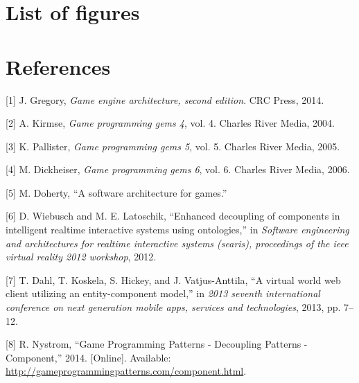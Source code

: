\documentclass[twoside, 12pt, a4paper, openany]{book}
\begin{document}
\chapter*{List of figures}\label{list-of-figures}

\makeatletter
\renewcommand\listoffigures{%
} \makeatother

\listoffigures

\footnotesize
\clearpage
\pagestyle{plain} \fancyhf{} \lhead{} \chead{} \rhead{} \lfoot{}
\cfoot{} \rfoot{}

\chapter*{References}\label{references}

\hypertarget{refs}{}
\hypertarget{ref-gregory2014game}{}
{[}1{]} J. Gregory, \emph{Game engine architecture, second edition}. CRC
Press, 2014.

\hypertarget{ref-game_programming_gems_4}{}
{[}2{]} A. Kirmse, \emph{Game programming gems 4}, vol. 4. Charles River
Media, 2004.

\hypertarget{ref-game_programming_gems_5}{}
{[}3{]} K. Pallister, \emph{Game programming gems 5}, vol. 5. Charles
River Media, 2005.

\hypertarget{ref-game_programming_gems_6}{}
{[}4{]} M. Dickheiser, \emph{Game programming gems 6}, vol. 6. Charles
River Media, 2006.

\hypertarget{ref-doherty2003software}{}
{[}5{]} M. Doherty, ``A software architecture for games.''

\hypertarget{ref-Wiebusch:2012}{}
{[}6{]} D. Wiebusch and M. E. Latoschik, ``Enhanced decoupling of
components in intelligent realtime interactive systems using
ontologies,'' in \emph{Software engineering and architectures for
realtime interactive systems (searis), proceedings of the ieee virtual
reality 2012 workshop}, 2012.

\hypertarget{ref-6658092}{}
{[}7{]} T. Dahl, T. Koskela, S. Hickey, and J. Vatjus-Anttila, ``A
virtual world web client utilizing an entity-component model,'' in
\emph{2013 seventh international conference on next generation mobile
apps, services and technologies}, 2013, pp. 7--12.

\hypertarget{ref-robertnystorm_gpp_component}{}
{[}8{]} R. Nystrom, ``Game Programming Patterns - Decoupling Patterns -
Component,'' 2014. {[}Online{]}. Available:
\url{http://gameprogrammingpatterns.com/component.html}.
\end{document}
